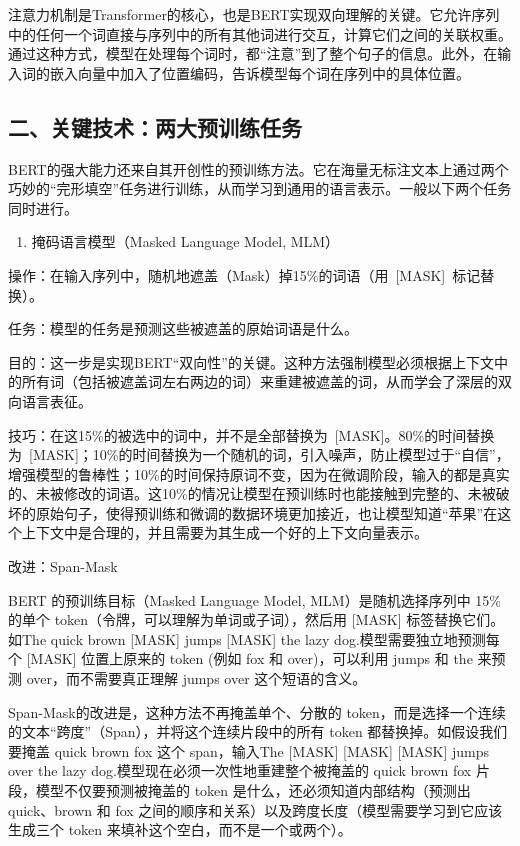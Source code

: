 注意力机制是Transformer的核心，也是BERT实现双向理解的关键。它允许序列中的任何一个词直接与序列中的所有其他词进行交互，计算它们之间的关联权重。通过这种方式，模型在处理每个词时，都``注意''到了整个句子的信息。此外，在输入词的嵌入向量中加入了位置编码，告诉模型每个词在序列中的具体位置。

\hypertarget{ux4e8cux5173ux952eux6280ux672fux4e24ux5927ux9884ux8badux7ec3ux4efbux52a1}{%
\subsection{二、关键技术：两大预训练任务}\label{ux4e8cux5173ux952eux6280ux672fux4e24ux5927ux9884ux8badux7ec3ux4efbux52a1}}

BERT的强大能力还来自其开创性的预训练方法。它在海量无标注文本上通过两个巧妙的``完形填空''任务进行训练，从而学习到通用的语言表示。一般以下两个任务同时进行。

\begin{enumerate}
\def\labelenumi{\arabic{enumi}.}
\tightlist
\item
  掩码语言模型（Masked Language Model, MLM）
\end{enumerate}

操作：在输入序列中，随机地遮盖（Mask）掉15\%的词语（用~{[}MASK{]}~标记替换）。

任务：模型的任务是预测这些被遮盖的原始词语是什么。

目的：这一步是实现BERT``双向性''的关键。这种方法强制模型必须根据上下文中的所有词（包括被遮盖词左右两边的词）来重建被遮盖的词，从而学会了深层的双向语言表征。

技巧：在这15\%的被选中的词中，并不是全部替换为~{[}MASK{]}。80\%的时间替换为~{[}MASK{]}；10\%的时间替换为一个随机的词，引入噪声，防止模型过于``自信''，增强模型的鲁棒性；10\%的时间保持原词不变，因为在微调阶段，输入的都是真实的、未被修改的词语。这10\%的情况让模型在预训练时也能接触到完整的、未被破坏的原始句子，使得预训练和微调的数据环境更加接近，也让模型知道``苹果''在这个上下文中是合理的，并且需要为其生成一个好的上下文向量表示。

改进：Span-Mask

BERT 的预训练目标（Masked Language Model, MLM）是随机选择序列中 15\% 的单个 token（令牌，可以理解为单词或子词），然后用 {[}MASK{]} 标签替换它们。如The quick brown {[}MASK{]} jumps {[}MASK{]} the lazy dog.模型需要独立地预测每个 {[}MASK{]} 位置上原来的 token (例如 fox 和 over)，可以利用 jumps 和 the 来预测 over，而不需要真正理解 jumps over 这个短语的含义。

Span-Mask的改进是，这种方法不再掩盖单个、分散的 token，而是选择一个连续的文本``跨度''（Span），并将这个连续片段中的所有 token 都替换掉。如假设我们要掩盖 quick brown fox 这个 span，输入The {[}MASK{]} {[}MASK{]} {[}MASK{]} jumps over the lazy dog.模型现在必须一次性地重建整个被掩盖的 quick brown fox 片段，模型不仅要预测被掩盖的 token 是什么，还必须知道内部结构（预测出 quick、brown 和 fox 之间的顺序和关系）以及跨度长度（模型需要学习到它应该生成三个 token 来填补这个空白，而不是一个或两个）。

